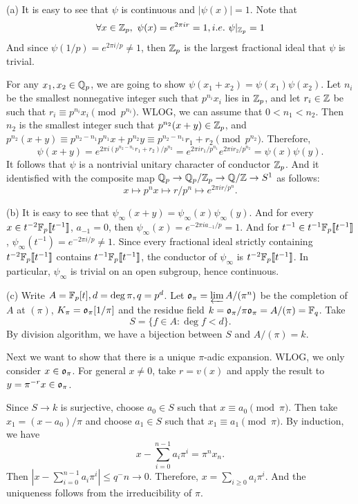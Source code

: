 \begin{solution}
(a) It is easy to see that $\psi$ is continuous and $|\psi(x)| = 1$.
Note that
\[\forall x \in \mathbb{Z}_p, \ \psi(x) = e ^ {2 \pi i r} = 1, i.e. \ \psi|_{\mathbb{Z}_p} = 1 \]
And since $\psi (1 / p) = e^{2 \pi i/ p} \neq 1$, then $\mathbb{Z}_p$ is the largest fractional ideal
that $\psi$ is trivial.

For any $x_1, x_2\in \mathbb{Q}_p$, we are going to show $\psi(x_1 + x_2) = \psi(x_1) \psi(x_2)$.
Let $n_i$ be the smallest nonnegative integer such that $p^{n_i} x_i$ lies in $\mathbb{Z}_p$, and let
$r_i \in \mathbb{Z}$ be such that $r_i \equiv p^{n_i} x_i \pmod{p^{n_i}}$. WLOG, we can assume that
$0 < n_1 < n_2$. Then $n_2$ is the smallest integer such that $p^{n_2} (x + y) \in \mathbb{Z}_p$,
and $p^{n_2}(x + y) \equiv p^{n_2 - n_1} p^{n_1} x + p^ {n_2} y \equiv p^{n_2 - n_1} r_1 + r_2
\pmod{p ^ {n_2}}$. Therefore,
\[\psi(x + y) = e^{2\pi i (p^{n_2 - n_1} r_1 + r_2) / p^{n_2}} =  e^{2\pi i r_1/ p^{n_1}} e^{2 \pi i r_2/ p^{n_2}}
= \psi(x) \psi(y).  \]
It follows that $\psi$ is a nontrivial unitary character of conductor $\mathbb{Z}_p$.
And it identisfied with the composite map $\mathbb{Q}_p \to \mathbb{Q}_p / \mathbb{Z}_p \to \mathbb{Q}/ \mathbb{Z} \to S^1$ as follows:
\[x \mapsto p ^ n x \mapsto r / p ^ n \mapsto e ^ {2 \pi i r / p ^ n}. \]

(b) It is easy to see that $\psi_\infty (x + y) = \psi_\infty(x) \psi_\infty(y)$. And for
every $x \in t^{-2}\mathbb{F}_p\llbracket t^{-1} \rrbracket$, $a_{-1} = 0$, then $\psi_\infty(x) = e^{-2 \pi i a_{-1} / p} = 1$.
And for $t^{-1} \in t^{-1} \mathbb{F}_p\llbracket t^{-1} \rrbracket$, $\psi_\infty (t^{-1}) = e^{-2 \pi i / p} \neq 1$.
Since every fractional ideal strictly containing $t^{-2}\mathbb{F}_p\llbracket t^{-1} \rrbracket$ contains
$t^{-1}\mathbb{F}_p\llbracket t^{-1} \rrbracket$, the conductor of $\psi_\infty$ is $t^{-2}\mathbb{F}_p\llbracket t^{-1} \rrbracket$.
In particular, $\psi_\infty$ is trivial on an open subgroup, hence continuous.

(c) Write $A = \mathbb{F}_p[t], d = \deg \pi, q = p ^ d$. Let $\mathfrak{o}_\pi = \varprojlim A / (\pi^n)$ be the
completion of $A$ at $(\pi)$, $K_\pi = \mathfrak{o}_\pi [1/ \pi]$ and the residue field $k = \mathfrak{o}_\pi
/ \pi \mathfrak{o}_\pi = A / (\pi) = \mathbb{F}_q$. Take
\[S = \{f \in A : \deg f < d\}. \]
By division algorithm, we have a bijection between $S$ and $A / (\pi) = k$.

Next we want to show that there is a unique $\pi$-adic expansion. WLOG, we only consider
$x \in \mathfrak{o}_\pi$. For general $x \neq 0$, take $r = v(x)$ and apply the result to
$y = \pi ^{-r} x \in \mathfrak{o}_\pi$.

Since $S \to k$ is surjective, choose $a_0 \in S$ such that $x \equiv a_0 \pmod{\pi}$. Then take
$x_1 = (x - a_0)/ \pi$ and choose $a_1 \in S$ such that $x_1 \equiv a_1 \pmod{\pi}$. By
induction, we have
\[x - \sum_{i = 0}^{n-1} a_i \pi ^ i = \pi^n x_n. \]
Then $|x - \sum_{i = 0}^{n-1} a_i \pi ^ i| \le q ^ -n \to 0$.
Therefore, $x = \sum_{i\ge 0}a_i \pi ^i$. And the uniqueness follows from the irreducibility of
$\pi$.


\end{solution}
